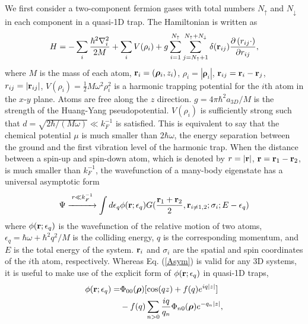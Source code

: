 \documentclass[twocolumn, prl]{revtex4}
\begin{document}
We first consider a two-component fermion gases with total numbers $N_{\uparrow}$ and $N_{\downarrow}$ in each component in a quasi-1D trap. The Hamiltonian is written as
\begin{equation}
H =  - \sum\limits_i {\frac{{{\hbar ^2}\nabla _i^2}}{{2M}}}  + \sum\limits_i V ({\rho _i}) + g\sum\limits_{i = 1}^{{N_ \uparrow }} {\sum\limits_{j = {N_ \uparrow } + 1}^{{N_ \uparrow } + {N_ \downarrow }} {\delta ({{\bf{r}}_{ij}})\frac{{\partial \left( {{r_{ij}} \cdot } \right)}}{{\partial {r_{ij}}}}} } ,
\end{equation}
where $M$ is the mass of each atom, ${\bf r}_i=({\bm \rho}_i, z_i)$, $\rho_i=|{\bm \rho}_i|$, ${\bf r}_{ij}={\bf r}_i-{\bf r}_j$, $r_{ij}=|{\bf r}_{ij}|$, $V(\rho_i)=\frac{1}{2}M\omega^2\rho^2_i$ is a harmonic trapping potential for the $i$th atom in the $x$-$y$ plane. Atoms are free along the $z$ direction. $g=4\pi \hbar^2 a_{3D}/M$ is the strength of the Huang-Yang pseudopotential. $V(\rho_i)$ is sufficiently strong such that $d=\sqrt{2\hbar/(M\omega)}\ll k_F^{-1}$ is satisfied. This is equivalent to say that the chemical potential $\mu$ is much smaller than $2\hbar\omega$, the energy separation between the ground and the first vibration level of the harmonic trap.  When the distance between a spin-up and spin-down atom, which is denoted by $r=|{\bf r}|$, ${\bf r}={\bf r}_1-{\bf r}_2$, is much smaller than $k_F^{-1}$, the wavefunction of a many-body eigenstate has a universal asymptotic form
 \begin{equation}
\Psi \stackrel{r\ll k_F^{-1}}{\xrightarrow{\hspace*{1cm}} }  \int d\epsilon_q \phi({\bf r};\epsilon_q)G(\frac{{\bf r}_1+{\bf r}_2}{2}, {\bf r}_{i\neq 1,2}; \sigma_i;E-\epsilon_q) \label{Asym}
\end{equation}
where $\phi({\bf r};\epsilon_q)$ is the wavefunction of the relative motion of two atoms,  $\epsilon_q=\hbar \omega + \hbar^2q^2/M$ is the colliding energy, $q$ is the corresponding momentum, and $E$ is the total energy of the system.  $ {\bf r}_{i}$ and  $\sigma_i$ are the spatial and spin coordinates of the $i$th atom, respectively. Whereas Eq. (\ref{Asym}) is valid for any 3D systems, it is useful to make use of the explicit form of $\phi({\bf r};\epsilon_q)$ in quasi-1D traps,
\begin{equation}
\begin{split}
\phi({\bf r};\epsilon_q) =& \Phi_{00}({\bm \rho})[\cos(qz)+f(q)e^{iq|z|}]\\
&-f(q)\sum_{n>0}\frac{iq}{q_n}\Phi_{n0}({\bm \rho})e^{-q_n |z|},\label{2bwf}
\end{split}
\end{equation} 
\end{document}
